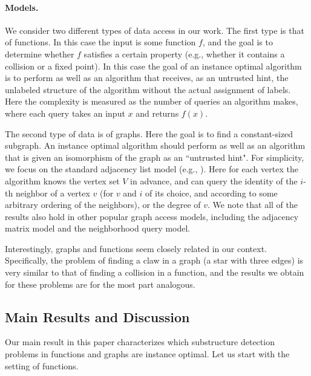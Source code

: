 \documentclass[11pt]{article}
\numberwithin{equation}{section}
\newcommand{\1}{\mathbf{1}}
\begin{document}
\paragraph{Models.}
We consider two different types of data access in our work. The first type is that of functions. In this case the input is some function $f$, and the goal is to determine whether $f$ satisfies a certain property (e.g., whether it contains a collision or a fixed point). In this case the goal of an instance optimal algorithm is to perform as well as an algorithm that receives, as an untrusted hint, the unlabeled structure of the algorithm without the actual assignment of labels. Here the complexity is measured as the number of queries an algorithm makes, where each query takes an input $x$ and returns $f(x)$.


The second type of data is of graphs. Here the goal is to find a constant-sized subgraph. An instance optimal algorithm should perform as well as an algorithm that is given an isomorphism of the graph as an ``untrusted hint". For simplicity, we focus on the standard adjacency list model (e.g., \cite{Gonen2011}). Here for each vertex the algorithm knows the vertex set $V$ in advance, and can query the identity of the $i$-th neighbor of a vertex $v$ (for $v$ and $i$ of its choice, and according to some arbitrary ordering of the neighbors), or the degree of $v$. We note that all of the results also hold in other popular graph access models, including the adjacency matrix model and the neighborhood query model. 

Interestingly, graphs and functions seem closely related in our context. Specifically, the problem of finding a claw in a graph (a star with three edges) is very similar to that of finding a collision in a function, and the results we obtain for these problems are for the most part analogous.










\subsection{Main Results and Discussion}
\label{subsec:main_results}





Our main result in this paper characterizes which substructure detection problems in functions and graphs are instance optimal. 
Let us start with the setting of functions. 
\end{document}
